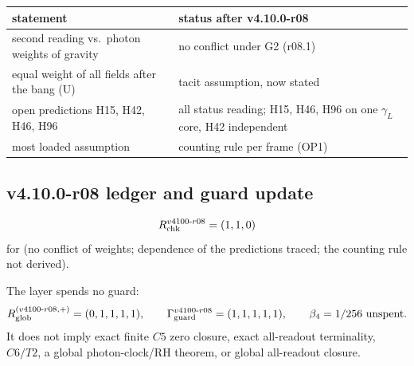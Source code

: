 \begin{center}
\small
\begin{tabular}{@{}>{\raggedright\arraybackslash}p{}>{\raggedright\arraybackslash}p{}@{}}
\toprule
statement & status after v4.10.0-r08\\
\midrule
second reading vs.\ photon weights of gravity & no conflict under G2 (r08.1)\\
equal weight of all fields after the bang (U) & tacit assumption, now stated\\
open predictions H15, H42, H46, H96 & all status reading; H15, H46, H96 on one \(\gamma_L\) core, H42 independent\\
most loaded assumption & counting rule per frame (OP1)\\
\bottomrule
\end{tabular}
\end{center}

\subsection*{v4.10.0-r08 ledger and guard update}
\label{subsec:v4100-r08-ledger-guard}

\[
R_{\rm chk}^{v4100\text{-}r08}=(1,1,0)
\]
for (no conflict of weights; dependence of the predictions traced; the counting rule not derived).

The layer spends no guard:
\[
R_{\rm glob}^{(v4100\text{-}r08,+)}=(0,1,1,1,1),
\qquad
\Gamma_{\rm guard}^{v4100\text{-}r08}=(1,1,1,1,1),
\qquad
\beta_4=1/256\ \text{unspent}.
\]
It does not imply exact finite \(C5\) zero closure, exact all-readout terminality,
\(C6/T2\), a global photon-clock/RH theorem, or global all-readout closure.
